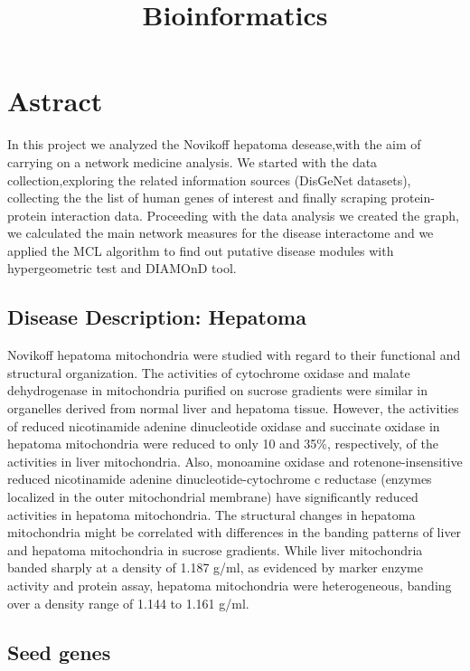\documentclass[
]{article}
\title{Bioinformatics}
\author{}
\date{\vspace{-2.5em}}
\begin{document}
\maketitle

\hypertarget{astract}{%
\section{Astract}\label{astract}}

In this project we analyzed the Novikoff hepatoma desease,with the aim
of carrying on a network medicine analysis. We started with the data
collection,exploring the related information sources (DisGeNet
datasets), collecting the the list of human genes of interest and
finally scraping protein-protein interaction data. Proceeding with the
data analysis we created the graph, we calculated the main network
measures for the disease interactome and we applied the MCL algorithm to
find out putative disease modules with hypergeometric test and DIAMOnD
tool.

\hypertarget{disease-description-hepatoma}{%
\subsection{Disease Description:
Hepatoma}\label{disease-description-hepatoma}}

Novikoff hepatoma mitochondria were studied with regard to their
functional and structural organization. The activities of cytochrome
oxidase and malate dehydrogenase in mitochondria purified on sucrose
gradients were similar in organelles derived from normal liver and
hepatoma tissue. However, the activities of reduced nicotinamide adenine
dinucleotide oxidase and succinate oxidase in hepatoma mitochondria were
reduced to only 10 and 35\%, respectively, of the activities in liver
mitochondria. Also, monoamine oxidase and rotenone-insensitive reduced
nicotinamide adenine dinucleotide-cytochrome c reductase (enzymes
localized in the outer mitochondrial membrane) have significantly
reduced activities in hepatoma mitochondria. The structural changes in
hepatoma mitochondria might be correlated with differences in the
banding patterns of liver and hepatoma mitochondria in sucrose
gradients. While liver mitochondria banded sharply at a density of 1.187
g/ml, as evidenced by marker enzyme activity and protein assay, hepatoma
mitochondria were heterogeneous, banding over a density range of 1.144
to 1.161 g/ml.

\hypertarget{seed-genes}{%
\subsection{Seed genes}\label{seed-genes}}
\end{document}
